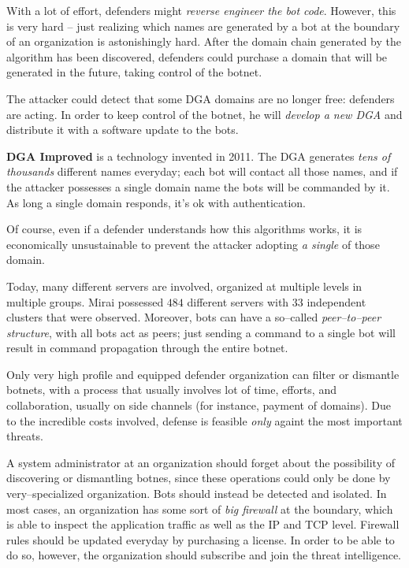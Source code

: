 \documentclass[10pt]{extbook}
\begin{document}
With a lot of effort, defenders might \emph{reverse engineer the bot code}.
However, this is very hard -- just realizing which names are generated by a bot
at the boundary of an organization is astonishingly hard. After the domain
chain generated by the algorithm has been discovered, defenders could purchase
a domain that will be generated in the future, taking control of the botnet.

The attacker could detect that some DGA domains are no longer free: defenders
are acting. In order to keep control of the botnet, he will \emph{develop a new
DGA} and distribute it with a software update to the bots.

\textbf{DGA Improved} is a technology invented in 2011. The DGA generates
\emph{tens of thousands} different names everyday; each bot will contact all
those names, and if the attacker possesses a single domain name the bots will
be commanded by it. As long a single domain responds, it's ok with
authentication.

Of course, even if a defender understands how this algorithms works, it is
economically unsustainable to prevent the attacker adopting \emph{a single}
of those domain.

Today, many different servers are involved, organized at multiple levels in
multiple groups. Mirai possessed $484$ different servers with $33$ independent
clusters that were observed. Moreover, bots can have a so--called
\emph{peer--to--peer structure}, with all bots act as peers; just sending a
command to a single bot will result in command propagation through the entire
botnet.

Only very high profile and equipped defender organization can filter or
dismantle botnets, with a process that usually involves lot of time, efforts,
and collaboration, usually on side channels (for instance, payment of domains).
Due to the incredible costs involved, defense is feasible \emph{only} againt
the most important threats.

A system administrator at an organization should forget about the possibility
of discovering or dismantling botnes, since these operations could only be done
by very--specialized organization. Bots should instead be detected and isolated.
In most cases, an organization has some sort of \emph{big firewall} at the
boundary, which is able to inspect the application traffic as well as the IP
and TCP level. Firewall rules should be updated everyday by purchasing a
license. In order to be able to do so, however, the organization should
subscribe and join the threat intelligence.
\end{document}
